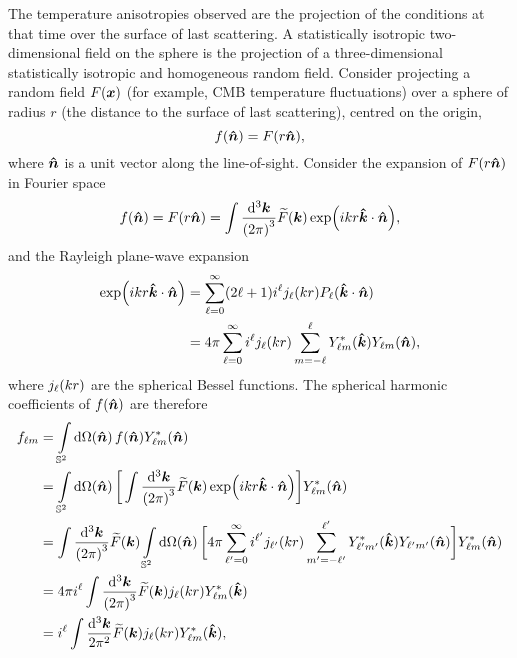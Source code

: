 The temperature anisotropies observed are the projection of the conditions at that time over the surface of last scattering.
A statistically isotropic two-dimensional field on the sphere is the projection of a three-dimensional statistically isotropic and homogeneous random field.
Consider projecting a random field \(F(\vb*{x})\) (for example, CMB temperature fluctuations) over a sphere of radius \(r\) (the distance to the surface of last scattering), centred on the origin, \ie{}
%
\begin{equation}
	f(\vu*{n})
	= F(r\vu*{n}),
\end{equation}
%
where \(\vu*{n}\) is a unit vector along the line-of-sight.
Consider the expansion of \(F(r\vu*{n})\) in Fourier space
%
\begin{equation}
	f(\vu*{n})
	= F(r\vu*{n})
	= \int\frac{\dd[3]{\vb*{k}}}{{(2\pi)}^{3}} \fourier{F}(\vb*{k}) \exp(i k r\vu*{k}\cdot\vu*{n}),
\end{equation}
%
and the Rayleigh plane-wave expansion
%
\begin{align}
	\exp(i k r\vu*{k}\cdot\vu*{n})
	 & = \sum\limits_{\ell=0}^{\infty} (2\ell+1) i^{\ell} \bessel{k r} P_{\ell}(\vu*{k}\cdot\vu*{n}) \nonumber{}                                   \\
	 & = 4\pi \sum\limits_{\ell=0}^{\infty} i^{\ell} \bessel{k r} \sum\limits_{m=-\ell}^{\ell} \conj{\harmonic{Y}}(\vu*{k}) \harmonic{Y}(\vu*{n}),
\end{align}
%
where \(\bessel{k r}\) are the spherical Bessel functions.
The spherical harmonic coefficients of \(f(\vu*{n})\) are therefore
%
\begin{align}
	\harmonic{f}
	 & = \integrateSphere{\vu*{n}} f(\vu*{n}) \conj{\harmonic{Y}}(\vu*{n}) \nonumber{}                                                                                                                                                                                                                       \\
	 & = \integrateSphere{\vu*{n}} \bigg[\int\frac{\dd[3]{\vb*{k}}}{{(2\pi)}^{3}} \fourier{F}(\vb*{k}) \exp(i k r\vu*{k}\cdot\vu*{n})\bigg] \conj{\harmonic{Y}}(\vu*{n}) \nonumber{}                                                                                                                         \\
	 & = \int\frac{\dd[3]{\vb*{k}}}{{(2\pi)}^{3}} \fourier{F}(\vb*{k}) \integrateSphere{\vu*{n}} \bigg[4\pi \sum\limits_{\ell'=0}^{\infty} i^{\ell'} \bessel[']{k r} \sum\limits_{m'=-\ell'}^{\ell'} \conj{\harmonic[']{Y}}(\vu*{k}) \harmonic[']{Y}(\vu*{n})\bigg] \conj{\harmonic{Y}}(\vu*{n}) \nonumber{} \\
	 & = 4\pi i^{\ell} \int\frac{\dd[3]{\vb*{k}}}{{(2\pi)}^{3}} \fourier{F}(\vb*{k}) \bessel{k r} \conj{\harmonic{Y}}(\vu*{k}) \nonumber{}                                                                                                                                                                   \\
	 & = i^{\ell} \int\frac{\dd[3]{\vb*{k}}}{2\pi^{2}} \fourier{F}(\vb*{k}) \bessel{k r} \conj{\harmonic{Y}}(\vu*{k}),
\end{align}
